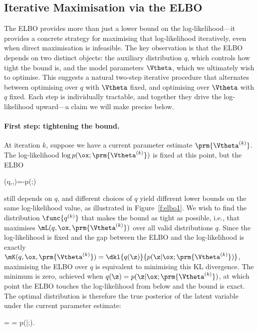 \subsection*{Iterative Maximisation via the ELBO}

The ELBO provides more than just a lower bound on the log-likelihood---it provides a
concrete strategy for maximising that log-likelihood iteratively, even when direct
maximisation is infeasible. The key observation is that the ELBO depends on two distinct
objects: the auxiliary distribution $q$, which controls how tight the bound is, and the
model parameters $\Vtheta$, which we ultimately wish to optimise. This suggests a natural
two-step iterative procedure that alternates between optimising over $q$ with $\Vtheta$
fixed, and optimising over $\Vtheta$ with $q$ fixed. Each step is individually tractable,
and together they drive the log-likelihood upward---a claim we will make precise below.

\paragraph{First step: tightening the bound.}
At iteration $k$, suppose we have a current parameter estimate $\prm{\Vtheta^{(k)}}$.
The log-likelihood $\log p(\ox;\prm{\Vtheta^{(k)}})$ is fixed at this point, but the ELBO
\begin{myequation}
\mL(q,\ox,)=-\leq \log p(\ox;)
\end{myequation}
still depends on $q$, and different choices of $q$ yield different lower bounds on the same
log-likelihood value, as illustrated in Figure~\ref{f:elbo1}. We wish to find the distribution
$\func{q^{(k)}}$ that makes the bound as tight as possible, i.e., that maximises
$\mL(q,\ox,\prm{\Vtheta^{(k)}})$ over all valid distributions $q$. Since the log-likelihood
is fixed and the gap between the ELBO and the log-likelihood is exactly
$\mK(q,\ox,\prm{\Vtheta^{(k)}}) = \dkl{q(\z)}{p(\z|\ox;\prm{\Vtheta^{(k)}})}$,
maximising the ELBO over $q$ is equivalent to minimising this KL divergence. The
minimum is zero, achieved when $q(\z) = p(\z|\ox;\prm{\Vtheta^{(k)}})$, at which point the
ELBO touches the log-likelihood from below and the bound is exact. The optimal
distribution is therefore the true posterior of the latent variable under the current
parameter estimate:
\begin{myequation}
  = = p(\z|\ox;).
\end{myequation}

